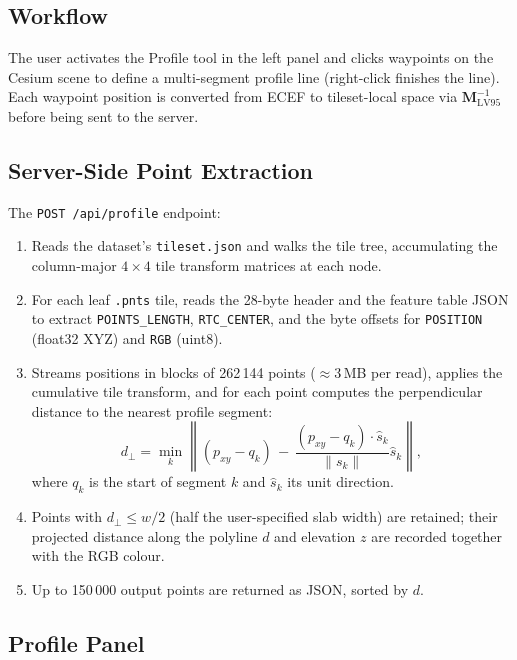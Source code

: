 \subsection{Workflow}

The user activates the Profile tool in the left panel and clicks waypoints on
the Cesium scene to define a multi-segment profile line (right-click finishes
the line). Each waypoint position is converted from ECEF to tileset-local
space via $\mathbf{M}_{\text{LV95}}^{-1}$ before being sent to the server.

\subsection{Server-Side Point Extraction}

The \texttt{POST /api/profile} endpoint:
\begin{enumerate}
  \item Reads the dataset's \texttt{tileset.json} and walks the tile tree,
    accumulating the column-major $4 \times 4$ tile transform matrices at
    each node.
  \item For each leaf \texttt{.pnts} tile, reads the 28-byte header and
    the feature table JSON to extract \texttt{POINTS\_LENGTH},
    \texttt{RTC\_CENTER}, and the byte offsets for \texttt{POSITION}
    (float32 XYZ) and \texttt{RGB} (uint8).
  \item Streams positions in blocks of 262\,144 points ($\approx 3$\,MB per
    read), applies the cumulative tile transform, and for each point computes
    the perpendicular distance to the nearest profile segment:
    \begin{equation}
      d_\perp = \min_k \left\|
        (p_{xy} - q_k)\,-\,
        \frac{(p_{xy}-q_k)\cdot\hat{s}_k}{\|s_k\|}\hat{s}_k
      \right\|,
    \end{equation}
    where $q_k$ is the start of segment $k$ and $\hat{s}_k$ its unit direction.
  \item Points with $d_\perp \leq w/2$ (half the user-specified slab width)
    are retained; their projected distance along the polyline $d$ and
    elevation $z$ are recorded together with the RGB colour.
  \item Up to 150\,000 output points are returned as JSON, sorted by $d$.
\end{enumerate}

\subsection{Profile Panel}

